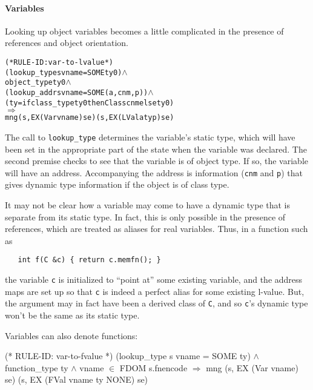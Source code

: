 \documentclass[11pt]{article}
\begin{document}
\paragraph{Variables} Looking up object variables becomes a little
complicated in the presence of references and object orientation.
%
%
\begin{alltt}
(* RULE-ID: var-to-lvalue *)
     (lookup_type s vname = SOME ty0) \(\land\)
     object_type ty0 \(\land\)
     (lookup_addr s vname = SOME (a,cnm,p)) \(\land\)
     (ty = if class_type ty0 then Class cnm else ty0)
   \(\Rightarrow\)
     mng (s, EX (Var vname) se) (s, EX (LVal a ty p) se)
\end{alltt}
%
The call to \texttt{lookup_type} determines the variable's static
type, which will have been set in the appropriate part of the state
when the variable was declared.  The second premise checks to see that
the variable is of object type.  If so, the variable will have an
address.  Accompanying the address is information (\texttt{cnm} and
\texttt{p}) that gives dynamic type information if the object is of
class type.

It may not be clear how a variable may come to have a dynamic type
that is separate from its static type.  In fact, this is only possible
in the presence of references, which are treated as aliases for real
variables.  Thus, in a function such as
\begin{verbatim}
   int f(C &c) { return c.memfn(); }
\end{verbatim}
the variable \texttt{c} is initialized to ``point at'' some existing
variable, and the address maps are set up so that \texttt{c} is indeed
a perfect alias for some existing l-value.  But, the argument may in
fact have been a derived class of \texttt{C}, and so \texttt{c}'s
dynamic type won't be the same as its static type.

Variables can also denote functions:
%
%
\begin{stdrule}
(* RULE-ID: var-to-fvalue *)
     (lookup_type s vname = SOME ty) \(\land\)
     function_type ty \(\land\)
     vname \(\in\) FDOM s.fnencode
   \(\Rightarrow\)
     mng (s, EX (Var vname) se) (s, EX (FVal vname ty NONE) se)
\end{stdrule}
\end{document}
